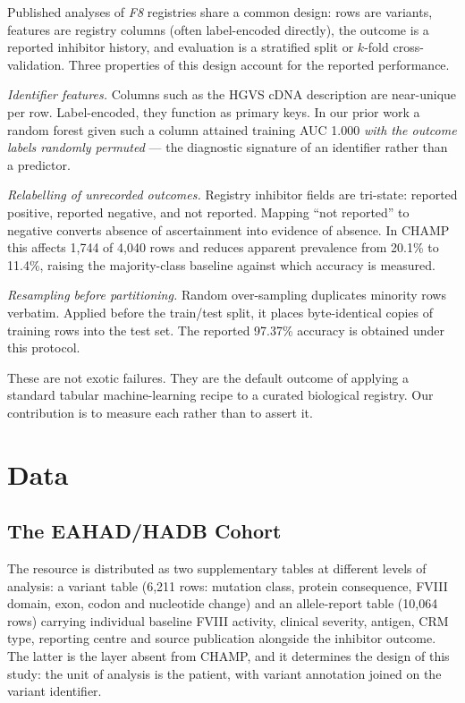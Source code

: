 \documentclass[conference]{IEEEtran}
\begin{document}
Published analyses of \textit{F8} registries share a common design: rows are
variants, features are registry columns (often label-encoded directly), the
outcome is a reported inhibitor history, and evaluation is a stratified split
or $k$-fold cross-validation. Three properties of this design account for the
reported performance.

\textit{Identifier features.} Columns such as the HGVS cDNA description are
near-unique per row. Label-encoded, they function as primary keys. In our prior
work a random forest given such a column attained training AUC 1.000
\textit{with the outcome labels randomly permuted} --- the diagnostic
signature of an identifier rather than a predictor.

\textit{Relabelling of unrecorded outcomes.} Registry inhibitor fields are
tri-state: reported positive, reported negative, and not reported. Mapping
``not reported'' to negative converts absence of ascertainment into evidence of
absence. In CHAMP this affects 1{,}744 of 4{,}040 rows and reduces apparent
prevalence from 20.1\% to 11.4\%, raising the majority-class baseline against
which accuracy is measured.

\textit{Resampling before partitioning.} Random over-sampling duplicates
minority rows verbatim. Applied before the train/test split, it places
byte-identical copies of training rows into the test set. The reported 97.37\%
accuracy \cite{singh} is obtained under this protocol.

These are not exotic failures. They are the default outcome of applying a
standard tabular machine-learning recipe to a curated biological registry. Our
contribution is to measure each rather than to assert it.

\section{Data}

\subsection{The EAHAD/HADB Cohort}
The resource \cite{eahad} is distributed as two supplementary tables at
different levels of analysis: a variant table (6{,}211 rows: mutation class,
protein consequence, FVIII domain, exon, codon and nucleotide change) and an
allele-report table (10{,}064 rows) carrying individual baseline FVIII
activity, clinical severity, antigen, CRM type, reporting centre and source
publication alongside the inhibitor outcome. The latter is the layer absent
from CHAMP, and it determines the design of this study: the unit of analysis
is the patient, with variant annotation joined on the variant identifier.
\end{document}
